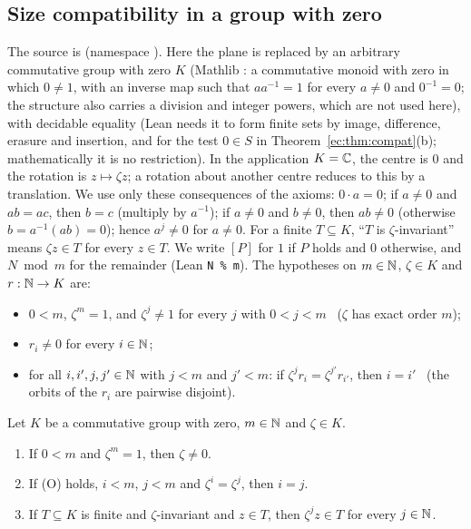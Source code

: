 \subsection{Size compatibility in a group with zero}\label{ec:ssec:compat}

The source is  (namespace ). Here the plane is replaced
by an arbitrary commutative group with zero $K$ (Mathlib : a commutative monoid with zero in
which $0\ne1$, with an inverse map such that $aa^{-1}=1$ for every $a\ne0$ and $0^{-1}=0$; the structure also carries a
division and integer powers, which are not used here), with decidable equality (Lean needs it to form finite sets by
image, difference, erasure and insertion, and for the test $0\in S$ in Theorem~\ref{ec:thm:compat}(b); mathematically
it is no restriction). In the application $K=\mathbb C$, the centre is $0$ and the rotation is
$z\mapsto\zeta z$; a rotation about another centre reduces to this by a translation. We use only these consequences of
the axioms: $0\cdot a=0$; if $a\ne0$ and $ab=ac$, then $b=c$ (multiply by $a^{-1}$); if $a\ne0$ and $b\ne0$, then
$ab\ne0$ (otherwise $b=a^{-1}(ab)=0$); hence $a^j\ne0$ for $a\ne0$. For a finite $T\subseteq K$, ``$T$ is
$\zeta$-invariant'' means $\zeta z\in T$ for every $z\in T$. We write $[P]$ for $1$ if $P$ holds and $0$ otherwise,
and $N\bmod m$ for the remainder (Lean \texttt{N \% m}). The hypotheses on $m\in\mathbb N$, $\zeta\in K$ and $r:\mathbb N\to K$ are:
\begin{itemize}
\item[(O)] $0<m$, $\zeta^m=1$, and $\zeta^j\ne1$ for every $j$ with $0<j<m$ \ ($\zeta$ has exact order $m$);
\item[(R0)] $r_i\ne0$ for every $i\in\mathbb N$;
\item[(RD)] for all $i,i',j,j'\in\mathbb N$ with $j<m$ and $j'<m$: if $\zeta^jr_i=\zeta^{j'}r_{i'}$, then $i=i'$ \ (the
  orbits of the $r_i$ are pairwise disjoint).
\end{itemize}

\begin{lemma}\label{ec:lem:pc-basic}
Let $K$ be a commutative group with zero, $m\in\mathbb N$ and $\zeta\in K$.
\begin{enumerate}[label=(\alph*)]
\item If $0<m$ and $\zeta^m=1$, then $\zeta\ne0$.
\item If \textup{(O)} holds, $i<m$, $j<m$ and $\zeta^i=\zeta^j$, then $i=j$.
\item If $T\subseteq K$ is finite and $\zeta$-invariant and $z\in T$, then $\zeta^jz\in T$ for every $j\in\mathbb N$.
\end{enumerate}
\end{lemma}


